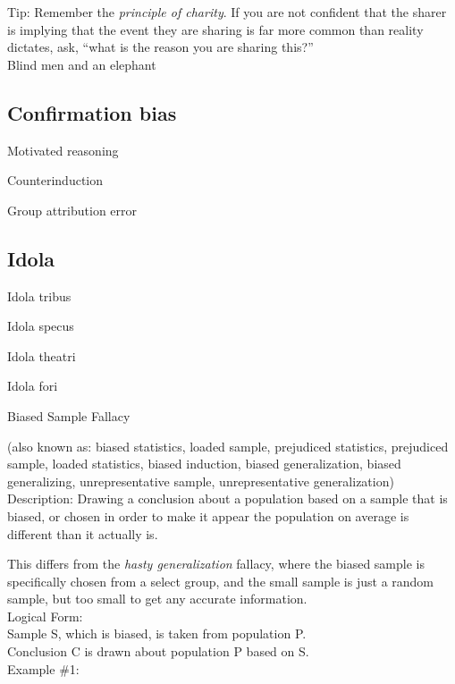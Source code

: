 \documentclass[a4paper,12pt,single,pdftex]{scrartcl}
\begin{document}
    
      Tip: Remember the {\em principle of charity}. If you are not confident that the sharer is implying that the event they are sharing is far more common than reality dictates, ask, “what is the reason you are sharing this?”
    \\

  

Blind men and an elephant\subsection{Confirmation bias}


Motivated reasoning

Counterinduction

Group attribution error\subsection{Idola}


Idola tribus

Idola specus

Idola theatri

Idola fori

Biased Sample Fallacy
    
      (also known as: biased statistics, loaded sample, prejudiced statistics, prejudiced sample, loaded statistics, biased induction, biased generalization, biased generalizing, unrepresentative sample, unrepresentative generalization)
    \\

  
    Description: Drawing a conclusion about a population based on a sample that is biased, or chosen in order to make it appear the population on average is different than it actually is.

    
      This differs from the {\it hasty generalization} fallacy, where the biased sample is specifically chosen from a select group, and the small sample is just a random sample, but too small to get any accurate information.
    \\

    
      Logical Form:
    \\

    
      Sample S, which is biased, is taken from population P.
    \\

    
      Conclusion C is drawn about population P based on S.
    \\

    
      Example \#1:
    \\
\end{document}

